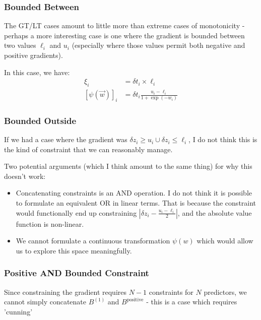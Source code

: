 \documentclass[]{article}
\begin{document}
			\subsubsection{Bounded Between}

				The GT/LT cases amount to little more than extreme cases of monotonicity - perhaps a more interesting case is one where the gradient is bounded between two values $\ell_i$ and $u_i$ (especially where those values permit both negative and positive gradients).


				In this case, we have:
				\begin{align}
					\xi_i &  = \delta t_i \times \ell_i
					\\
					[\psi(\vec{w})]_i & = \delta t_i \frac{u_i - \ell_i}{1 + \exp(-w_i)}
				\end{align}

		
				
				

			\subsubsection{Bounded Outside}

				If we had a case where the gradient was $\delta z_i \geq u_i \cup \delta z_i \leq \ell_i$, I do not think this is the kind of constraint that we can reasonably manage.

				Two potential arguments (which I think amount to the same thing) for why this doesn't work:

				\begin{itemize}
					\item Concatenating constraints is  an AND operation. I do not think it is possible to formulate an equivalent OR in linear terms. That is because the constraint would functionally end up constraining $\left| \delta z_i - \frac{u_i - \ell_i}{2} \right|$, and the absolute value function is non-linear.
					\item We cannot formulate a continuous transformation $\psi(w)$ which would allow us to explore this space meaningfully. 
				\end{itemize}


			\subsubsection{Positive AND Bounded Constraint}

				Since constraining the gradient requires $N-1$ constraints for $N$ predictors, we cannot simply concatenate $B^{(1)}$ and $B^{\text{positive}}$ - this is a case which requires 'cunning'
\end{document}
